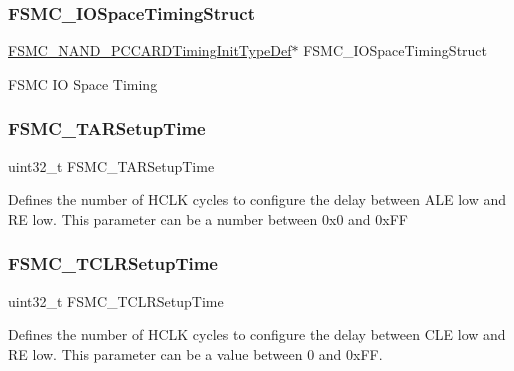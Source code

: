 \subsubsection{\texorpdfstring{FSMC\_IOSpaceTimingStruct}{FSMC\_IOSpaceTimingStruct}}
{\footnotesize\ttfamily \mbox{\hyperlink{struct_f_s_m_c___n_a_n_d___p_c_c_a_r_d_timing_init_type_def}{F\+S\+M\+C\+\_\+\+N\+A\+N\+D\+\_\+\+P\+C\+C\+A\+R\+D\+Timing\+Init\+Type\+Def}}$\ast$ F\+S\+M\+C\+\_\+\+I\+O\+Space\+Timing\+Struct}

F\+S\+MC IO Space Timing \mbox{\label{struct_f_s_m_c___p_c_c_a_r_d_init_type_def_ab1fc3b07b6286b4974690191231f2773}} 
\subsubsection{\texorpdfstring{FSMC\_TARSetupTime}{FSMC\_TARSetupTime}}
{\footnotesize\ttfamily uint32\+\_\+t F\+S\+M\+C\+\_\+\+T\+A\+R\+Setup\+Time}

Defines the number of H\+C\+LK cycles to configure the delay between A\+LE low and RE low. This parameter can be a number between 0x0 and 0x\+FF \mbox{\label{struct_f_s_m_c___p_c_c_a_r_d_init_type_def_ab9fd4e9d4db1fc098d5f4ccffb80bf61}} 
\subsubsection{\texorpdfstring{FSMC\_TCLRSetupTime}{FSMC\_TCLRSetupTime}}
{\footnotesize\ttfamily uint32\+\_\+t F\+S\+M\+C\+\_\+\+T\+C\+L\+R\+Setup\+Time}

Defines the number of H\+C\+LK cycles to configure the delay between C\+LE low and RE low. This parameter can be a value between 0 and 0x\+FF. \mbox{\label{struct_f_s_m_c___p_c_c_a_r_d_init_type_def_a9ecc2cc3ec6462a8a86e545c9b8ff3cf}} 
